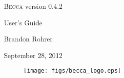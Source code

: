\documentclass[12pt,oneside]{book}
\begin{document}
\begin{centering}
\thispagestyle{empty}
\vspace{7cm}
{\huge \textsc{Becca} version 0.4.2 
\vspace{1cm}

User's Guide}
\vspace{4cm}

{\Large
Brandon Rohrer
\vspace{1cm}

September 28, 2012}

\vspace{4cm}

\begin{figure}[h]
\centering
\texttt{[image: figs/becca\_logo.eps]}
\end{figure}

\newpage
\end{centering}

\tableofcontents
\newpage

\addtolength{\parskip}{\baselineskip}

\setcounter{tocdepth}{0}











\appendix









%













\end{document}

